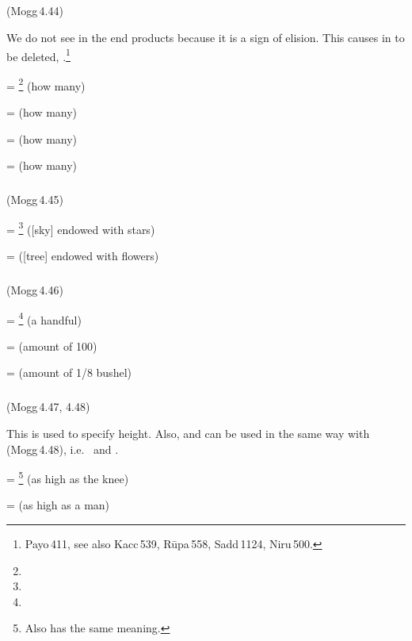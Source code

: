 \subparagraph*{} (Mogg\,4.44)\label{pacct2:rati}\label{pacct2:riiva}\label{pacct2:riivataka}\label{pacct2:rittaka}

We do not see  in the end products because it is a sign of elision. This  causes  in  to be deleted, .\footnote{Payo\,411, see also Kacc\,539, R\=upa\,558, Sadd\,1124, Niru\,500.}

 = \footnote{} (how many) \par
{} =  (how many) \par
{} =  (how many) \par
{} =  (how many) \par

\subparagraph*{} (Mogg\,4.45)\label{pacct2:ita}

 = \footnote{} ([sky] endowed with stars) \par
{} =  ([tree] endowed with flowers) \par

\subparagraph*{} (Mogg\,4.46)\label{pacct2:matta}

 = \footnote{} (a handful) \par
{} =  (amount of 100) \par
{} =  (amount of 1/8 bushel) \par

\subparagraph*{} (Mogg\,4.47, 4.48)\label{pacct2:taggha}

This is used to specify height. Also,  and  can be used in the same way with  (Mogg\,4.48), i.e.\  and .

 = \footnote{Also  has the same meaning.} (as high as the knee) \par
{} =  (as high as a man) \par

